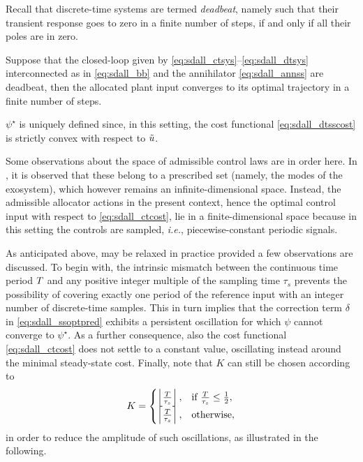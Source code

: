 Recall that discrete-time systems are termed \emph{deadbeat}, namely such that their transient response goes to zero in a finite number of steps, if and only if all their poles are in zero.

\begin{corollary}
  \label{cor:sdall_ftconv}
  Suppose that the closed-loop given by \eqref{eq:sdall_ctsys}--\eqref{eq:sdall_dtsys} interconnected as in \eqref{eq:sdall_bb} and the annihilator \eqref{eq:sdall_annss} are deadbeat, then the allocated plant input converges to its optimal trajectory in a finite number of steps.\closestatement
\end{corollary}

\begin{remark}
  \label{rem:sdall_unixss}
  $\psi^\star$ is uniquely defined since, in this setting, the cost functional \eqref{eq:sdall_dtsscost} is strictly convex with respect to $\tilde{u}$.\closeremark
\end{remark}

\begin{remark}
  \label{rem:sdall_finitespace}
  Some observations about the space of admissible control laws are in order here. In \cite{galeani_dynamic_2014}, it is observed that these belong to a prescribed set (namely, the modes of the exosystem), which however remains an infinite-dimensional space. Instead, the admissible allocator actions in the present context, hence the optimal control input with respect to \eqref{eq:sdall_ctcost}, lie in a finite-dimensional space because in this setting the controls are sampled, \emph{i.e.}, piecewise-constant periodic signals.\closeremark
\end{remark}

\begin{remark}
  \label{rem:sdall_tnotinz}
  As anticipated above,  may be relaxed in practice provided a few observations are discussed. To begin with, the intrinsic mismatch between the continuous time period $T$ and any positive integer multiple of the sampling time $\tau_s$ prevents the possibility of covering exactly one period of the reference input with an integer number of discrete-time samples. This in turn implies that the correction term $\delta$ in \eqref{eq:sdall_ssoptpred} exhibits a persistent oscillation for which $\psi$ cannot converge to $\psi^{\star}$. As a further consequence, also the cost functional \eqref{eq:sdall_ctcost} does not settle to a constant value, oscillating instead around the minimal steady-state cost. Finally, note that $K$ can still be chosen according to
  \begin{equation}
    \label{eq:sdall_krule}
    K = \begin{cases}
            \left\lfloor \frac{T}{\tau_s} \right\rfloor, & \text{if $\frac{T}{\tau_s} \leq \frac{1}{2}$},\\
            \left\lceil \frac{T}{\tau_s} \right\rceil, & \text{otherwise},
        \end{cases}
  \end{equation}
  in order to reduce the amplitude of such oscillations, as illustrated in the following.\closeremark
\end{remark}

